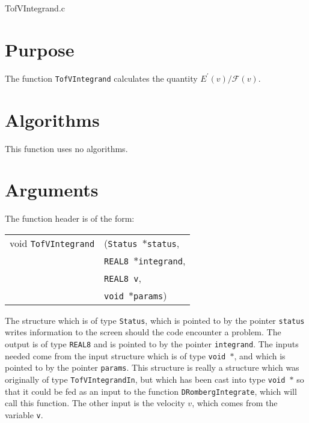 \documentclass[12pt]{article}
\begin{document}
\huge
\begin{center}
TofVIntegrand.c
\end{center}
\normalsize
\vspace{10mm}

\section{Purpose}

The function \texttt{TofVIntegrand} calculates the quantity $E^{\prime}(v)/\mathcal{F}(v)$.





\section{Algorithms}

This function uses no algorithms.


\section{Arguments}

The function header is of the form:

\vspace{5mm}

\begin{tabular}{ll}
void \texttt{TofVIntegrand}&(\texttt{Status $\ast$status},     \\
                                   &\texttt{REAL8 $\ast$integrand}, \\
                                   &\texttt{REAL8 v}, \\
                                   &\texttt{void $\ast$params})
\end{tabular}

\vspace{5mm}

The structure which is of type \texttt{Status}, which is pointed to by the pointer \texttt{status} writes information to the screen should the code encounter a problem. The output is of type \texttt{REAL8} and is pointed to by the pointer \texttt{integrand}. The inputs needed come from the input structure which is of type \texttt{void $\ast$}, and which is pointed to by the pointer \texttt{params}. This structure is really a structure which was originally of type \texttt{TofVIntegrandIn}, but which has been cast into type \texttt{void $\ast$} so that it could be fed as an input to the function \texttt{DRombergIntegrate}, which will call this function. The other input is the velocity $v$, which comes from the variable \texttt{v}. 
\end{document}
